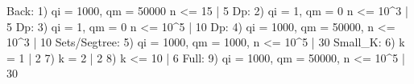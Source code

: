 Back: 1) qi = 1000, qm = 50000 n <= 15 | 5
Dp: 2) qi = 1, qm = 0 n <= 10^3 | 5
Dp: 3) qi = 1, qm = 0 n <= 10^5 | 10
Dp: 4) qi = 1000, qm = 50000, n <= 10^3 | 10
Sets/Segtree: 5) qi = 1000, qm = 1000, n <= 10^5 | 30
Small_K: 6) k = 1 | 2
         7) k = 2 | 2
         8) k <= 10 | 6
Full: 9) qi = 1000, qm = 50000, n <= 10^5 | 30
